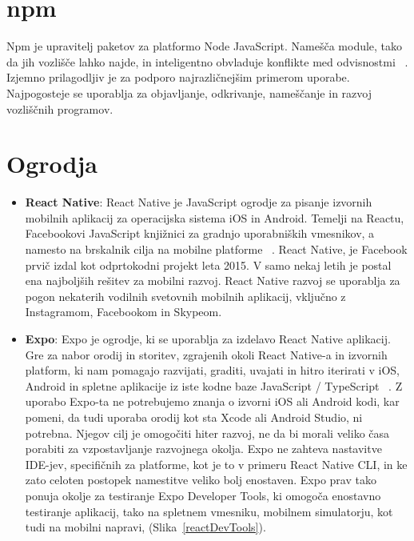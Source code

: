 \documentclass[a4paper, 12pt]{book}
\begin{document}
\section{npm}
Npm je upravitelj paketov za platformo Node JavaScript. Namešča module, tako da jih vozlišče lahko najde, in inteligentno obvladuje konflikte med odvisnostmi ~\cite{npm}.  Izjemno prilagodljiv je za podporo najrazličnejšim primerom uporabe. Najpogosteje se uporablja za objavljanje, odkrivanje, nameščanje in razvoj vozliščnih programov.

\section{Ogrodja}
 \begin{itemize}
  \item \textbf{React Native}: React Native je JavaScript ogrodje za pisanje izvornih mobilnih aplikacij za operacijska sistema iOS in Android. Temelji na Reactu, Facebookovi JavaScript knjižnici za gradnjo uporabniških vmesnikov, a namesto na brskalnik cilja na mobilne platforme ~\cite{RN}. 
React Native, je Facebook prvič izdal kot odprtokodni projekt leta 2015. V samo nekaj letih je postal ena najboljših rešitev za mobilni razvoj. React Native razvoj se uporablja za pogon nekaterih vodilnih svetovnih mobilnih aplikacij, vključno z Instagramom, Facebookom in Skypeom.
  
  \item \textbf{Expo}: Expo je ogrodje, ki se uporablja za izdelavo React Native aplikacij. Gre za nabor orodij in storitev, zgrajenih okoli React Native-a in izvornih platform, ki nam pomagajo razvijati, graditi, uvajati in hitro iterirati v iOS, Android in spletne aplikacije iz iste kodne baze JavaScript / TypeScript ~\cite{EXPO}. Z uporabo Expo-ta ne potrebujemo znanja o izvorni iOS ali Android kodi, kar pomeni, da tudi uporaba orodij kot sta Xcode ali Android Studio, ni potrebna. Njegov cilj je omogočiti hiter razvoj, ne da bi morali veliko časa porabiti za vzpostavljanje razvojnega okolja. Expo ne zahteva nastavitve IDE-jev, specifičnih za platforme, kot je to v primeru React Native CLI, in ke zato celoten postopek namestitve veliko bolj enostaven. Expo prav tako ponuja okolje za testiranje Expo Developer Tools, ki omogoča enostavno testiranje aplikacij, tako na spletnem vmesniku, mobilnem simulatorju, kot tudi na mobilni napravi, (Slika~\ref{reactDevTools}).
  

\end{itemize}
\end{document}
